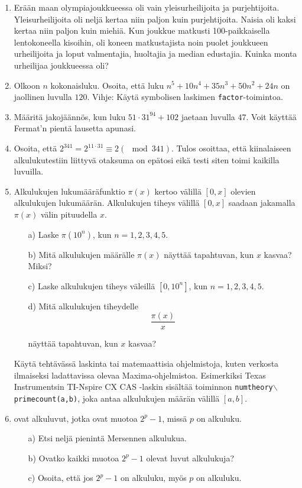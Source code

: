 \begin{enumerate}
\item Erään maan olympiajoukkueessa oli vain yleisurheilijoita ja
purjehtijoita. Yleisurheilijoita oli neljä kertaa niin paljon kuin
purjehtijoita. Naisia oli kaksi kertaa niin paljon kuin miehiä.
Kun joukkue matkusti 100-paikkaisella lentokoneella kisoihin,
oli koneen matkustajista noin puolet joukkueen urheilijoita ja
loput valmentajia, huoltajia ja median edustajia. Kuinka monta
urheilijaa joukkueessa oli?

\item Olkoon $n$ kokonaisluku. Osoita, että luku
$n^5+10n^4+35n^3+50n^2+24n$ on jaollinen luvulla $120$. Vihje:
Käytä symbolisen laskimen {\tt factor}-toimintoa.

\item
Määritä jakojäännös, kun luku $51\cdot 31^{94}+102$ jaetaan
luvulla $47$. Voit käyttää Fermat'n pientä lausetta apunasi.

\item Osoita, että $2^{341} = 2^{11 \cdot 31} \equiv 2 (\mod 341)
$. Tulos osoittaa, että kiinalaiseen alkulukutestiin liittyvä
otaksuma on epätosi eikä testi siten toimi kaikilla luvuilla.

\item
Alkulukujen lukumääräfunktio $\pi(x)$ kertoo välillä $[0,x]$
olevien alkulukujen lukumäärän. Alkulukujen tiheys välillä $[0,x]
$ saadaan jakamalla $\pi(x)$ välin pituudella $x$.
\begin{itemize}
\item[a)] Laske $\pi(10^n)$, kun $n=1,2,3,4,5$.
\item[b)] Mitä alkulukujen määrälle $\pi(x)$ näyttää tapahtuvan,
kun $x$ kasvaa? Miksi?
\item[c)] Laske alkulukujen tiheys väleillä $[0,10^n]$, kun
$n=1,2,3,4,5$.
\item[d)] Mitä alkulukujen tiheydelle
\[
\frac{\pi(x)}{x}
\]

näyttää tapahtuvan, kun $x$ kasvaa?
\end{itemize}
Käytä tehtävässä laskinta tai matemaattisia ohjelmistoja, kuten
verkosta ilmaiseksi ladattavissa olevaa Maxima-ohjelmistoa.
Esimerkiksi Texas Instrumentsin TI-Nspire CX CAS -laskin sisältää
toiminnon {\tt numtheory$\backslash$primecount(a,b)}, joka antaa
alkulukujen määrän välillä $[a,b]$.

\item {} ovat alkuluvut, jotka ovat
muotoa $2^p - 1$, missä $p$ on alkuluku.
\begin{itemize}
\item[a)] Etsi neljä pienintä Mersennen alkulukua.
\item[b)] Ovatko kaikki muotoa $2^p - 1$ olevat luvut alkulukuja?
\item[c)] Osoita, että jos $2^p - 1$ on alkuluku, myös $p$ on
alkuluku.


\end{itemize}
\end{enumerate}
